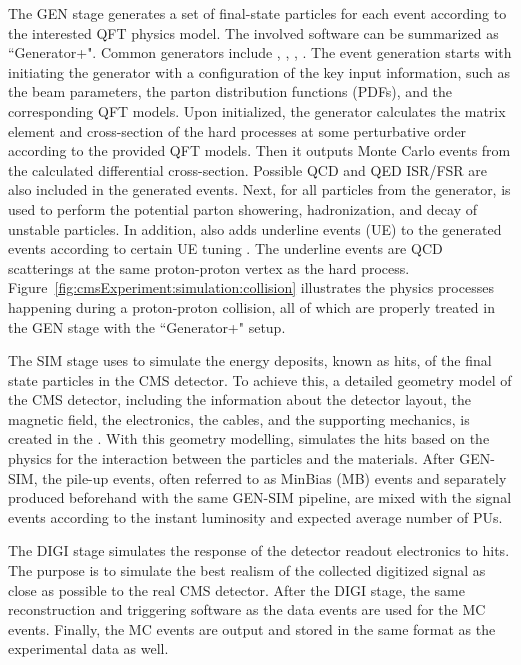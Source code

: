 The GEN stage generates a set of final-state particles for each event according to the interested QFT physics model. The involved software can be summarized as ``Generator+\PYTHIA". Common generators include \MADGRAPH, \POWHEG, \HERWIG, \SHERPA. The event generation starts with initiating the generator with a configuration of the key input information, such as the beam parameters, the parton distribution functions (PDFs), and the corresponding QFT models.  Upon initialized, the generator calculates the matrix element and cross-section of the hard processes at some perturbative order according to the provided QFT models. Then it outputs Monte Carlo events from the calculated differential cross-section. Possible QCD and QED ISR/FSR are also included in the generated events. Next, for all particles from the generator, \PYTHIA is used to perform the potential parton showering, hadronization, and decay of unstable particles. In addition, \PYTHIA also adds underline events (UE) to the generated events according to certain UE tuning \cite{Sirunyan:2019dfx}. The underline events are QCD scatterings at the same proton-proton vertex as the hard process. Figure~\ref{fig:cmsExperiment:simulation:collision} illustrates the physics processes happening during a proton-proton collision, all of which are properly treated in the GEN stage with the ``Generator+\PYTHIA" setup.




The SIM stage uses \GEANTfour to simulate the energy deposits, known as hits, of the final state particles in the CMS detector. To achieve this, a detailed geometry model of the CMS detector, including the information about the detector layout, the magnetic field, the electronics, the cables, and the supporting mechanics, is created in the \GEANTfour. With this geometry modelling, \GEANTfour simulates the hits based on the physics for the interaction between the particles and the materials. After GEN-SIM, the pile-up events, often referred to as MinBias (MB) events and separately produced beforehand with the same GEN-SIM pipeline, are mixed with the signal events according to the instant luminosity and expected average number of PUs.

The DIGI stage simulates the response of the detector readout electronics to hits. The purpose is to simulate the best realism of the collected digitized signal as close as possible to the real CMS detector. After the DIGI stage, the same reconstruction and triggering software as the data events are used for the MC events. Finally, the MC events are output and stored in the same format as the experimental data as well.